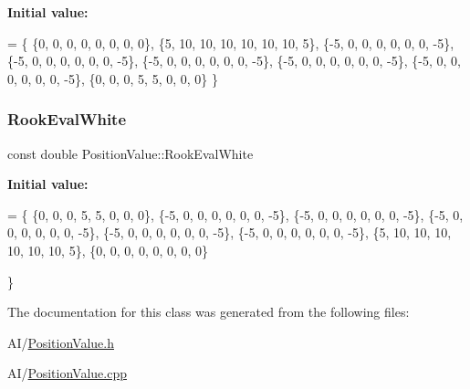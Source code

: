 {\bfseries Initial value\+:}
\begin{DoxyCode}
=
        \{
                \{0,  0,  0,  0,  0,  0,  0,  0\},
                \{5, 10, 10, 10, 10, 10, 10,  5\},
                \{-5,  0,  0,  0,  0,  0,  0, -5\},
                \{-5,  0,  0,  0,  0,  0,  0, -5\},
                \{-5,  0,  0,  0,  0,  0,  0, -5\},
                \{-5,  0,  0,  0,  0,  0,  0, -5\},
                \{-5,  0,  0,  0,  0,  0,  0, -5\},
                \{0,  0,  0,  5,  5,  0,  0,  0\}
        \}
\end{DoxyCode}
\mbox{\label{class_position_value_a9998ca8f631fce65d1978dd70bacefe3}} 
\subsubsection{\texorpdfstring{Rook\+Eval\+White}{RookEvalWhite}}
{\footnotesize\ttfamily const double Position\+Value\+::\+Rook\+Eval\+White\hspace{0.3cm}{\ttfamily [static]}}

{\bfseries Initial value\+:}
\begin{DoxyCode}
=
        \{
                \{0,  0,  0,  5,  5,  0,  0,  0\},
                \{-5,  0,  0,  0,  0,  0,  0, -5\},
                \{-5,  0,  0,  0,  0,  0,  0, -5\},
                \{-5,  0,  0,  0,  0,  0,  0, -5\},
                \{-5,  0,  0,  0,  0,  0,  0, -5\},
                \{-5,  0,  0,  0,  0,  0,  0, -5\},
                \{5, 10, 10, 10, 10, 10, 10,  5\},
                \{0,  0,  0,  0,  0,  0,  0,  0\}

        \}
\end{DoxyCode}


The documentation for this class was generated from the following files\+:\begin{DoxyCompactItemize}
\item 
A\+I/\hyperlink{_position_value_8h}{Position\+Value.\+h}\item 
A\+I/\hyperlink{_position_value_8cpp}{Position\+Value.\+cpp}\end{DoxyCompactItemize}
